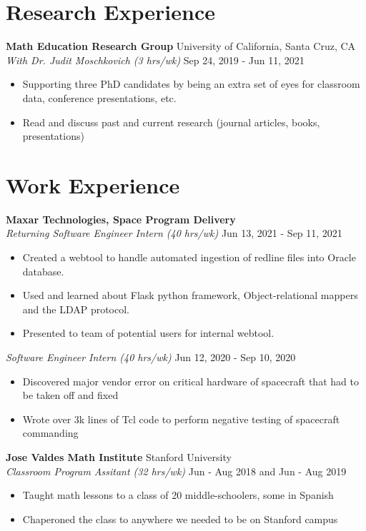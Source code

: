 \documentclass[10pt,letterpaper]{article}
\begin{document}
\section*{Research Experience} \hrulefill

\textbf{Math Education Research Group} \hfill University of California, Santa Cruz, CA\\
\textit{With Dr. Judit Moschkovich (3 hrs/wk)} \hfill Sep 24, 2019 - Jun 11, 2021 
\begin{itemize}
    \item Supporting three PhD candidates by being an extra set of eyes for classroom data, conference presentations, etc.
    \item Read and discuss past and current research (journal articles, books, presentations)
\end{itemize}


\section*{Work Experience} \hrulefill 

\textbf{Maxar Technologies, Space Program Delivery}\\
\textit{Returning Software Engineer Intern (40 hrs/wk)} \hfill Jun 13, 2021 - Sep 11, 2021
\begin{itemize}
    \item Created a webtool to handle automated ingestion of redline files into Oracle database.
    \item Used and learned about Flask python framework, Object-relational mappers and the LDAP protocol.
    \item Presented to team of potential users for internal webtool.
\end{itemize}
\textit{Software Engineer Intern (40 hrs/wk)} \hfill  Jun 12, 2020 - Sep 10, 2020
\begin{itemize}
    \item Discovered major vendor error on critical hardware of spacecraft that had to be taken off and fixed
    \item Wrote over 3k lines of Tcl code to perform negative testing of spacecraft commanding
\end{itemize}

\textbf{Jose Valdes Math Institute} \hfill Stanford University\\
\textit{Classroom Program Assitant (32 hrs/wk)} \hfill Jun - Aug 2018 and Jun - Aug 2019
\begin{itemize}
    \item Taught math lessons to a class of 20 middle-schoolers, some in Spanish
    \item Chaperoned the class to anywhere we needed to be on Stanford campus
\end{itemize}
\end{document}
